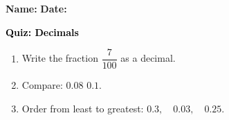 \documentclass[12pt, letterpaper, fleqn]{article}
\newcommand{\blank}{\underline{\hspace{2.2cm}}}
\begin{document}
\textbf{Name:} \underline{\hspace{5cm}}
\hfill
\textbf{Date:} \underline{\hspace{3cm}}\\

\begin{tcolorbox}[colback=customteal!20]
    \large\textcolor{black}{\textbf{Quiz: Decimals}}
\end{tcolorbox}
\begin{enumerate}[itemsep=3.5cm, leftmargin=0.6cm]
\item Write the fraction $\dfrac{7}{100}$ as a decimal.
\vspace{3.5cm}
\item Compare: $0.08$ \blank $0.1$.
\vspace{3.5cm}
\item Order from least to greatest: $0.3, \quad 0.03, \quad 0.25$.
\end{enumerate}
\end{document}

